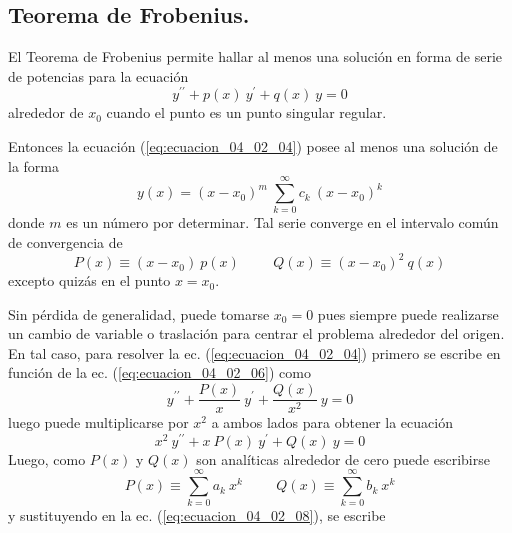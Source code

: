\subsection{Teorema de Frobenius.}
El Teorema de Frobenius permite hallar al menos una solución en forma de serie de potencias para la ecuación 
\begin{equation}
y^{\prime \prime} + p(x) \: y^{\prime} + q(x) \: y = 0
\label{eq:ecuacion_04_02_04}
\end{equation}
alrededor de $x_{0}$ cuando el punto es un punto singular regular.
\par
Entonces la ecuación (\ref{eq:ecuacion_04_02_04}) posee al menos una solución de la forma
\begin{equation}
y(x) = (x - x_{0})^{m} \: \sum_{k=0}^{\infty} c_{k} \: (x - x_{0})^{k}
\label{eq:ecuacion_04_02_05}
\end{equation}
donde $m$ es un número por determinar. Tal serie converge en el intervalo común de convergencia de
\begin{equation}
P(x) \equiv (x - x_{0}) \: p(x) \hspace{1cm} Q(x) \equiv (x - x_{0})^{2} \: q(x)
\label{eq:ecuacion_04_02_06}
\end{equation}
excepto quizás en el punto $x = x_{0}$.
\par
Sin pérdida de generalidad, puede tomarse $x_{0} = 0$ pues siempre puede realizarse un cambio de variable o traslación para centrar el problema alrededor del origen. En tal caso, para resolver la ec. (\ref{eq:ecuacion_04_02_04}) primero se escribe en función de la ec. (\ref{eq:ecuacion_04_02_06}) como
\begin{equation}
y^{\prime \prime} + \dfrac{P(x)}{x} \: y^{\prime} + \dfrac{Q(x)}{x^{2}} \: y = 0
\label{eq:ecuacion_04_02_07} 
\end{equation}
luego puede multiplicarse por $x^{2}$ a ambos lados para obtener la ecuación
\begin{equation}
x^{2} \: y^{\prime \prime} + x \: P(x) \: y^{\prime} + Q(x) \: y = 0
\label{eq:ecuacion_04_02_08} 
\end{equation}
Luego, como $P(x)$ y $Q(x)$ son analíticas alrededor de cero puede escribirse
\begin{equation}
P(x) \equiv \sum_{k=0}^{\infty} a_{k} \: x^{k} \hspace{1cm} Q(x) \equiv \sum_{k=0}^{\infty} b_{k} \: x^{k}
\label{eq:ecuacion_04_02_09}
\end{equation}
y sustituyendo en la ec. (\ref{eq:ecuacion_04_02_08}), se escribe
